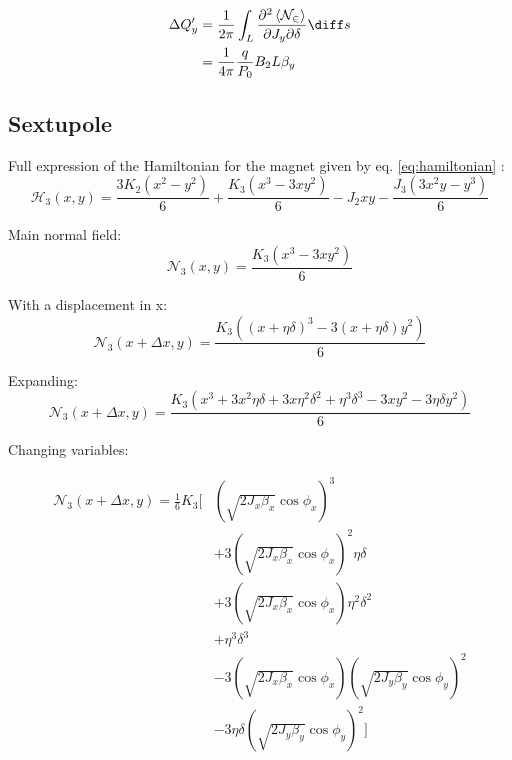 \begin{equation}\begin{aligned}
\Delta Q'_y &= \frac{1}{2\pi} \int_L \frac{\partial^2 \left< \mathcal{N_2} \right>}{\partial J_y \partial \delta} \diff s \\
  & = \frac{1}{4 \pi} \frac{q}{P_0} B_2 L \beta_y
\end{aligned}\end{equation}

\newpage

\hypertarget{sextupole-2}{%
\subsection{Sextupole}\label{sextupole-2}}

Full expression of the Hamiltonian for the magnet given by eq.
\ref{eq:hamiltonian} :
\begin{equation}\mathcal{H_3}(x, y) = \frac{3 K_{2} \left(x^{2} - y^{2}\right)}{6} + \frac{K_{3} \left(x^{3} - 3 x y^{2}\right)}{6} - J_{2} x y - \frac{J_{3} \left(3 x^{2}y - y^{3}\right)}{6}\end{equation}

Main normal field:
\begin{equation}\mathcal{N_3}(x, y) = \frac{K_{3} \left(x^{3} - 3 xy^{2}\right)}{6}\end{equation}

With a displacement in x:
\begin{equation}\mathcal{N_3}(x + \Delta x, y) = \frac{K_{3} \left((x + \eta \delta)^{3} - 3 (x + \eta \delta)y^{2}\right)}{6}\end{equation}

Expanding:
\begin{equation}\mathcal{N_3}(x + \Delta x, y) = \frac{K_{3} \left(x^3 + 3 x^2 \eta \delta + 3 x \eta^2 \delta^2 + \eta^3 \delta^3 - 3xy^2 - 3 \eta \delta y^2 \right)}{6}\end{equation}

Changing variables:

\begin{equation}\begin{aligned}
  \mathcal{N_3}(x + \Delta x, y) = \frac{1}{6} K_3 \biggl[&
       \left(\sqrt{2 J_x \beta_x} \cos \phi_x\right)^3 \\
  &    + 3 \left(\sqrt{2 J_x \beta_x} \cos \phi_x\right)^2 \eta \delta \\
  &    + 3 \left(\sqrt{2 J_x \beta_x} \cos \phi_x\right) \eta^2 \delta^2 \\
  &    + \eta^3 \delta^3 \\
  &    - 3 \left(\sqrt{2 J_x \beta_x} \cos \phi_x \right) \left(\sqrt{2 J_y \beta_y} \cos \phi_y \right)^2 \\
  &    - 3 \eta \delta (\sqrt{2 J_y \beta_y} \cos \phi_y)^2 \biggl]
\end{aligned}\end{equation}

